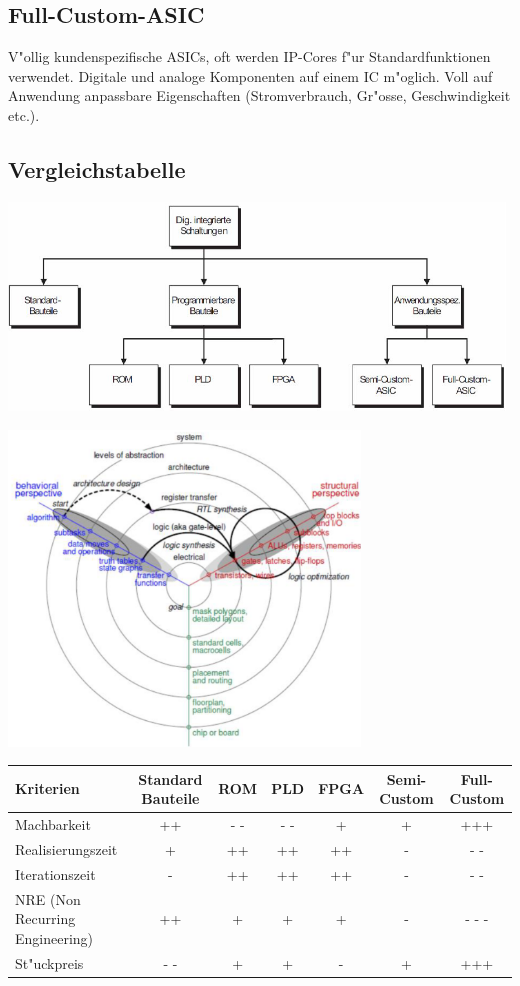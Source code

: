 \begin{scriptsize}
\begin{multicols}{2}
\subsection{Full-Custom-ASIC}
V"ollig kundenspezifische ASICs, oft werden IP-Cores f"ur Standardfunktionen verwendet. Digitale und analoge Komponenten auf einem IC m"oglich. Voll auf Anwendung anpassbare Eigenschaften (Stromverbrauch, Gr"osse, Geschwindigkeit etc.).
\end{multicols}

\end{scriptsize}

\subsection{Vergleichstabelle}
\begin{minipage}{0.41\textwidth}
\includegraphics[width=0.99\textwidth]{pics/devicecomparetables}
\end{minipage}
\hfill
\begin{minipage}{0.58\textwidth}
\includegraphics[width=0.7\textwidth]{pics/abstraktion.png}
\end{minipage}

\begin{tabular}{|l|c|c|c|c|c|c|}
	\hline
	Kriterien & Standard Bauteile & ROM & PLD & FPGA & Semi-Custom & Full-Custom \\
	\hline
	Machbarkeit & ++ & - - & - - & + & + & +++ \\
	\hline
	Realisierungszeit & + & ++ & ++ & ++ & - & - - \\
	\hline
	Iterationszeit & - & ++ & ++ & ++ & - & - - \\
	\hline
	NRE (Non Recurring Engineering) & ++ & + & + & + & - & - - -\\
	\hline
	St"uckpreis & - - & + & + & - & + & +++ \\
	\hline
\end{tabular}
	